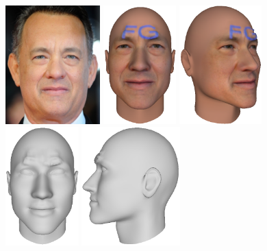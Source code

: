 \begin{figure}[t]
	\centering
	\hspace*{\fill}
	\includegraphics[height=1.8in]{introduction/images/tom_hanks_frontal_awards}\hfill
	\includegraphics[height=1.8in]{introduction/images/tom_hanks_frontal_awards_facegen}\hfill
	\includegraphics[height=1.8in]{introduction/images/tom_hanks_frontal_awards_facegen_profile}\hfill
	\includegraphics[height=1.8in]{introduction/images/tom_hanks_frontal_awards_facegen_no_texture}\hfill
	\includegraphics[height=1.8in]{introduction/images/tom_hanks_frontal_awards_facegen_no_texture_profile}

\end{figure}
